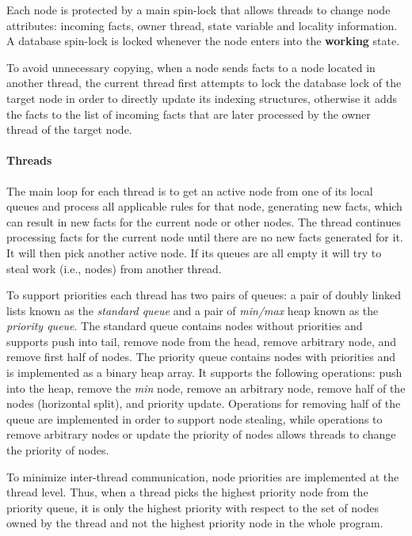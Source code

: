 Each node is protected by a main spin-lock that allows threads to
change node attributes: incoming facts, owner thread, state variable
and locality information.  A database spin-lock is locked whenever the
node enters into the \textbf{working} state.  

To avoid unnecessary copying, when a node sends facts to a node
located in another thread, the current thread first attempts to lock
the database lock of the target node in order to directly update its
indexing structures, otherwise it adds the facts to the list of
incoming facts that are later processed by the owner thread of the
target node.

\paragraph{Threads}

The main loop for each thread is to get an active node from one of its
local queues and process all applicable rules for that node, generating
new facts, which can result in new facts for the current node or other
nodes.  The thread continues processing facts for the current node
until there are no new facts generated for it.  It will then pick
another active node.  If its queues are all empty it will try to steal
work (i.e., nodes) from another thread.

To support priorities each thread has two pairs of queues: a pair of
doubly linked lists known as the \emph{standard queue} and a pair of
\emph{min/max} heap known as the \emph{priority queue}.  The standard queue
contains nodes without priorities and supports push into tail, remove
node from the head, remove arbitrary node, and remove first half of
nodes.  The priority queue contains nodes with priorities and is
implemented as a binary heap array. It supports the following
operations: push into the heap, remove the \emph{min} node, remove an
arbitrary node, remove half of the nodes (horizontal split), and
priority update.  Operations for removing half of the queue are
implemented in order to support node stealing, while operations to
remove arbitrary nodes or update the priority of nodes allows threads
to change the priority of nodes.

To minimize inter-thread communication, node priorities are
implemented at the thread level. Thus, when a thread picks the highest
priority node from the priority queue, it is only the highest priority
with respect to the set of nodes owned by the thread and not the
highest priority node in the whole program.  

